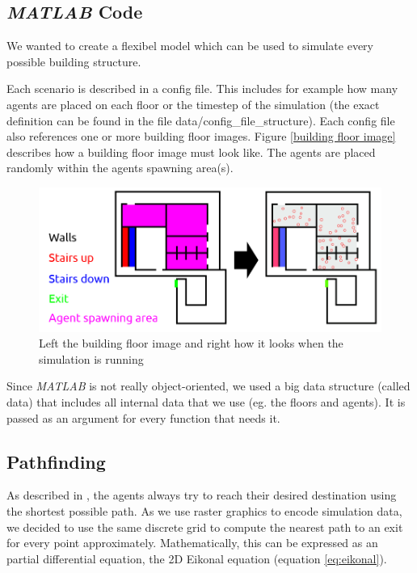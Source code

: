 \documentclass[11pt]{article}
\begin{document}
\subsection{\textit{MATLAB} Code} \label{matlab code}
We wanted to create a flexibel model which can be used to simulate every
possible building structure. 

Each scenario is described in a config file. This includes for example how many
agents are placed on each floor or the timestep of the simulation (the exact
definition can be found in the file data/config\_file\_structure). Each config
file also references one or more building floor images.
Figure \vref{building floor image} describes how a building floor
image must look like. The agents are placed randomly within the agents spawning
area(s).

\begin{figure}[h]
\centering
\includegraphics[width=\textwidth]{./images/config_floor_description.png}
\caption{Left the building floor image and right how it looks when the
simulation is running} 
\label{building floor image}
\end{figure}

Since \textit{MATLAB} is not really object-oriented, we used a big data structure (called
data) that includes all internal data that we use (eg. the floors and agents).
It is passed as an argument for every function that needs it.

\subsection{Pathfinding}
As described in \cite{SFMPD}, the agents always try to reach their desired destination
using the shortest possible path. As we use raster graphics to encode simulation data,
we decided to use the same discrete grid to compute the nearest path to an exit for every point approximately.
Mathematically, this can be expressed as an partial differential equation, the 2D Eikonal equation (equation \ref{eq:eikonal}).
\end{document}
